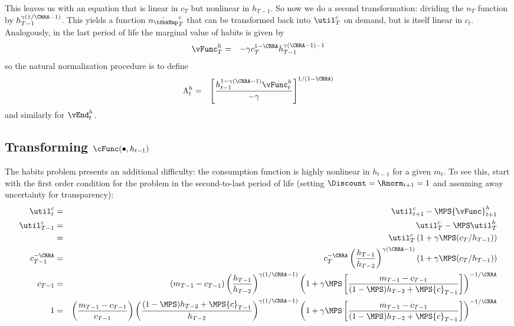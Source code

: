 \documentclass[titlepage]{\econtex}
\begin{document}
{  This leaves us with an equation that is linear in ${c}_{T}$ but
  nonlinear in $h_{T-1}$.  So now we do a second transformation:
  dividing the $n_{T}$ function by $h_{T-1}^{\gamma(1/\CRRA-1)}$.  This
  yields a function $\hat{n_{\tShkEmp}}_{T}^{c}$ that can be transformed back into
  $\util^{c}_{T}$ on demand, but is itself linear in ${c}_{t}.$  Analogously,
  in the last period of life the marginal value of habits is given by
  \begin{eqnarray*}
    {\vFunc}_{T}^{h} & = & -\gamma {c}_{T}^{1-\CRRA}h_{T-1}^{\gamma(\CRRA-1)-1}
  \end{eqnarray*}
  so the natural normalization procedure is to define
  \begin{eqnarray}
    \Lambda_{t}^{h} & = &
                          \left[\frac{h_{t-1}^{1-\gamma(\CRRA-1)}{\vFunc}_{t}^{h}}{-\gamma}\right]^{1/(1-\CRRA)}
  \end{eqnarray}
  and similarly for $\vEnd_{t}^{h}$.


  \hypertarget{Transforming-cFunc}{}
  \subsection{Transforming $\cFunc(\bullet,h_{t-1})$}

  The habits problem presents an additional difficulty: the consumption
  function is highly nonlinear in $h_{t-1}$ for a given ${m}_{t}$.   To
  see this, start with the first order condition for the problem in the
  second-to-last period of life (setting $\Discount = \Rnorm_{t+1} = 1$ and assuming
  away uncertainty for transparency):
  \begin{eqnarray}
    \util_{t}^{c}   & = & \util_{t+1}^{c} - \MPS {\vFunc}_{t+1}^{h}
    \\      \util_{T-1}^{c} & = & \util_{T}^{c} - \MPS \util_{T}^{h}
    \\  & = &  \util_{T}^{c}\left(1 + \gamma \MPS
              ({c}_{T}/h_{T-1})\right)
    \\      {c}_{T-1}^{-\CRRA} & = &
                                     {c}_{T}^{-\CRRA}\left(\frac{h_{T-1}}{h_{T-2}}\right)^{\gamma(\CRRA-1)}\left(1 + \gamma \MPS
                                     ({c}_{T}/h_{T-1})\right)  \\
    {c}_{T-1} & = &
                    ({m}_{T-1}-{c}_{T-1})\left(\frac{h_{T-1}}{h_{T-2}}\right)^{\gamma(1/\CRRA-1)}\left(1 +
                    \gamma \MPS \left[\frac{{m}_{T-1}-{c}_{T-1}}{(1-\MPS)h_{T-2}+\MPS
                    {c}_{T-1}}\right]\right)^{-1/\CRRA}
    \\      1 & = &
                    \left(\frac{{m}_{T-1}-{c}_{T-1}}{{c}_{T-1}}\right)\left(\frac{(1-\MPS)h_{T-2}+\MPS {c}_{T-1}}{h_{T-2}}\right)^{\gamma(1/\CRRA-1)}\left(1 +
                    \gamma \MPS \left[\frac{{m}_{T-1}-{c}_{T-1}}{(1-\MPS)h_{T-2}+\MPS
                    {c}_{T-1}}\right]\right)^{-1/\CRRA} \nonumber
    \\ \label{eq:oneeq}
  \end{eqnarray}

}
\end{document}
